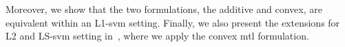 Moreover, we show that the two formulations, the {additive} and {convex}, are equivalent within an L1-\acrshort{svm} setting.
%
Finally, we also present the extensions for L2 and LS-\acrshort{svm} setting in~\cite{RuizAD21}, where we apply the convex \acrshort{mtl} formulation.


